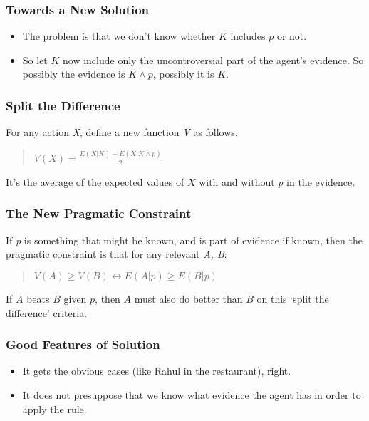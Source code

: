\begin{frame}

\frametitle{Towards a New Solution}
\label{towardsanewsolution}

\begin{itemize}
\item The problem is that we don't know whether $K$ includes $p$ or not.

\item So let $K$ now include only the uncontroversial part of the agent's evidence. So possibly the evidence is $K \wedge p$, possibly it is $K$.

\end{itemize}
\end{frame}

\begin{frame}

\frametitle{Split the Difference}
\label{splitthedifference}

For any action \emph{X}, define a new function \emph{V} as follows.

\begin{quote}

$V(X) = \frac{E(X | K) + E(X | K \wedge p)}{2}$
\end{quote}
It's the average of the expected values of $X$ with and without $p$ in the evidence. 

\end{frame}

\begin{frame}

\frametitle{The New Pragmatic Constraint}
\label{thenewpragmaticconstraint}

If \emph{p} is something that might be known, and is part of evidence if known, then the pragmatic constraint is that for any relevant \emph{A, B}:

\begin{quote}

$V(A) \geq V(B) \leftrightarrow E(A | p) \geq E(B | p)$
\end{quote}
If $A$ beats $B$ given $p$, then $A$ must also do better than $B$ on this `split the difference' criteria.

\end{frame}

\begin{frame}

\frametitle{Good Features of Solution}
\label{goodfeaturesofsolution}

\begin{itemize}
\item It gets the obvious cases (like Rahul in the restaurant), right.

\item It does not presuppose that we know what evidence the agent has in order to apply the rule.

\end{itemize}
\end{frame}

